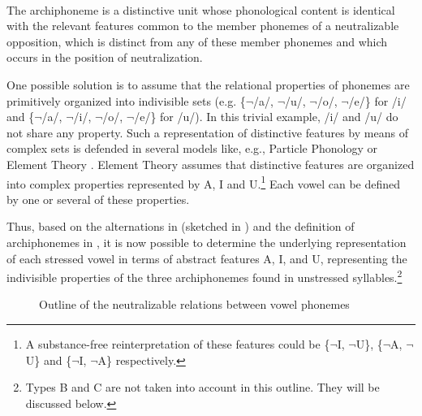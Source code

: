 \documentclass[output=paper,
modfonts,
newtxmath,
hidelinks,
]{langscibook}
\begin{document}
 \citep[201]{Akamatsu1988}\label{5:18}\\
The archiphoneme is a distinctive unit whose phonological content is identical with the relevant features common to the member phonemes of a neutralizable opposition, which is distinct from any of these member phonemes and which occurs in the position of neutralization.
\z

\noindent One possible solution is to assume that the relational properties of phonemes are primitively organized into indivisible sets (e.g. \{$\neg$/a/, $\neg$/u/, $\neg$/o/, $\neg$/e/\} for /i/ and \{$\neg$/a/, $\neg$/i/, $\neg$/o/, $\neg$/e/\} for /u/). In this trivial example, /i/ and /u/ do not share any property. Such a representation of distinctive features by means of complex sets is defended in several models like, e.g., Particle Phonology \citep{Schane1984} or Element Theory \citep{Kaye-etal1985}. Element Theory assumes that distinctive features are organized into complex properties represented by {\textbar}A{\textbar}, {\textbar}I{\textbar} and {\textbar}U{\textbar}.\footnote{A substance-free reinterpretation of these features could be \{$\neg${\textbar}I{\textbar}, $\neg${\textbar}U{\textbar}\}, \{$\neg${\textbar}A{\textbar}, $\neg${\textbar}U{\textbar}\} and \{$\neg${\textbar}I{\textbar}, $\neg${\textbar}A{\textbar}\} respectively.} Each vowel can be defined by one or several of these properties.

Thus, based on the alternations in  (sketched in ) and the definition of archiphonemes in , it is now possible to determine the underlying representation of each stressed vowel in terms of abstract features {\textbar}A{\textbar}, {\textbar}I{\textbar}, and {\textbar}U{\textbar}, representing the indivisible properties of the three archiphonemes found in unstressed syllables.\footnote{Types B and C are not taken into account in this outline. They will be discussed below.}


\begin{figure}
\caption{Outline of the neutralizable relations between vowel phonemes}
\label{5:f3}
\end{figure}
\end{document}
